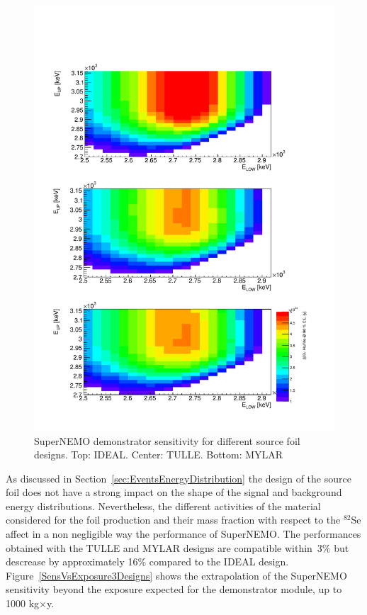 \documentclass[main.tex]{subfiles}
\begin{document}
\begin{figure}[h!]
\centering
\includegraphics[scale=0.7]{pictures/Chap4/Sensitivity3Designs.pdf}
\caption{SuperNEMO demonstrator sensitivity for different source foil designs. Top: IDEAL. Center: TULLE. Bottom: MYLAR}
\label{Sens2D-3designs}
\end{figure}


\bigskip


\NI As discussed in Section~\ref{sec:EventsEnergyDistribution} the design of the source foil does not have a strong impact on the shape of the signal and background energy distributions. Nevertheless, the different activities of the material considered for the foil production and their mass fraction with respect to the $^{\text{82}}$Se affect in a non negligible way the performance of SuperNEMO. The performances obtained with the TULLE and MYLAR designs are compatible within~3\% but descrease  by approximately 16\% compared to the IDEAL design. Figure~\ref{SensVsExposure3Designs} shows the extrapolation of the SuperNEMO sensitivity beyond the exposure expected for the demonstrator module, up to 1000 kg$\times$y.
\end{document}
